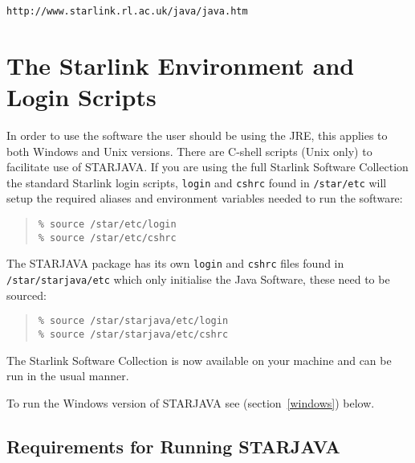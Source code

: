 \documentclass[twoside,11pt]{article}
\newcommand{\htmladdnormallink}[2]{#1}
\newcommand{\latex}[1]{#1}
\newcommand{\xlabel}[1]{}
\renewcommand{\_}{\texttt{\symbol{95}}}
\begin{document}
\htmladdnormallink{\texttt{http://www.starlink.rl.ac.uk/java/java.htm}}{http://www.starlink.rl.ac.uk/java/java.htm}

\section{\label{environment}\xlabel{environment}The Starlink Environment and Login Scripts}

In order to use the software the user should be using the JRE, this applies to both Windows 
and Unix versions. There are C-shell scripts (Unix only) to facilitate use of STARJAVA. 
If you are using the full Starlink Software Collection the standard Starlink login scripts, 
\texttt{login} and \texttt{cshrc} found in \texttt{/star/etc} will setup the required aliases 
and environment variables needed to run the software: 

\begin{quote}
\begin{verbatim}
% source /star/etc/login
% source /star/etc/cshrc
\end{verbatim}
\end{quote}

The STARJAVA package has its own \texttt{login} and \texttt{cshrc} files found in 
\texttt{/star/starjava/etc} which only initialise the Java Software, these need to be sourced:

\begin{quote}
\begin{verbatim}
% source /star/starjava/etc/login
% source /star/starjava/etc/cshrc
\end{verbatim}
\end{quote}

The Starlink Software Collection is now available on your machine and
can be run in the usual manner.

To run the Windows version of STARJAVA see \latex{(section~\ref{windows})} below.

\subsection{\label{Requirements}\xlabel{Requirements}Requirements for Running STARJAVA}
\end{document}
